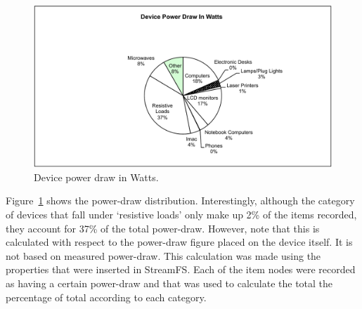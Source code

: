 \begin{figure}[htb!]
\begin{center}
\includegraphics[scale=0.7]{figs/PIE_CHART_SANS_WATTS}
\caption{Device power draw in Watts.}
\label{fig:piechart}
\end{center}
\end{figure}

Figure~\ref{fig:piechart} shows the power-draw distribution.  Interestingly, although the category of devices that 
fall under `resistive loads' only make up 2\% of the items recorded, they account for 37\% of the total power-draw.
However, note that this is calculated with respect to the power-draw figure placed on the device itself.  It is not
based on measured power-draw.  This calculation was made using the properties that were inserted in StreamFS.
Each of the item nodes were recorded as having a certain power-draw and that was used to calculate the total the 
percentage of total according to each category.

